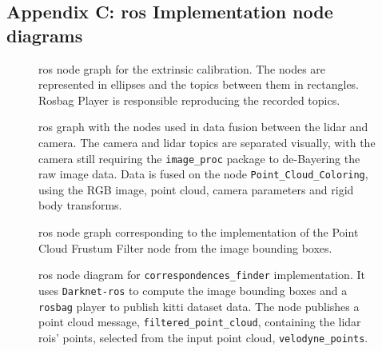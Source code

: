 \begin{landscape}
\section{Appendix C: \ac{ros} Implementation node diagrams} 
\label{appendix:appendix-diagrams}

\begin{figure}[!ht]
	\centering
	\def\svgwidth{\columnwidth}
	\graphicspath{{img/calibration/}}
	
	\caption{\ac{ros} node graph for the extrinsic calibration. The nodes are represented in  ellipses and the topics between them in rectangles. Rosbag Player is responsible reproducing the recorded topics.}
	\label{fig:extrinsic-calibration-rosgraph}
\end{figure}

\begin{figure}[!ht]
	\centering
	\def\svgwidth{\columnwidth}
	\graphicspath{{img/sensor_fusion/}}
		
		\caption[\ac{ros} node graph implemented for coloring the point cloud.]{\ac{ros} graph with the nodes used in data fusion between the \ac{lidar} and camera. The camera and \ac{lidar} topics are separated visually, with the camera still requiring the \texttt{image\_proc} package to de-Bayering the raw image data. Data is fused on the node \texttt{Point\_Cloud\_Coloring}, using the RGB image, point cloud, camera parameters and rigid body transforms.}
	\label{fig:sensor-fusion-rosgraph}
\end{figure}


\begin{figure}[!ht] \centering \def\svgwidth{\columnwidth}
	\graphicspath{{img/image-object-to-point-cloud/}}
	 \caption[\ac{ros} node graph for the
	point cloud frustum filter algorithm.]{\ac{ros} node graph corresponding to the implementation of
the Point Cloud Frustum Filter node from the image bounding boxes.} \label{fig:ros-graph-frustum}
\end{figure}


\begin{figure}[!ht]
	\centering
	\def\svgwidth{\columnwidth}
	\graphicspath{{img/image-object-to-point-cloud/}}
		
	\caption[\ac{ros} node diagram for the estimation ob point cloud bounding box from image bounding boxes of objects of interest.]{\ac{ros} node diagram for \texttt{correspondences\_finder} implementation. It uses \texttt{Darknet-ros} to compute the image bounding boxes and a \texttt{rosbag} player to publish \ac{kitti} dataset data. The node publishes a point cloud message, \texttt{filtered\_point\_cloud}, containing the \ac{lidar} \acp{roi}' points, selected from the input point cloud, \texttt{velodyne\_points}.}
	\label{fig:correspondences-finder-standalone}
\end{figure}


\end{landscape}
